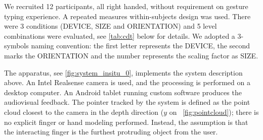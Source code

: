 \documentclass{chi-ext}
\newcommand{\cdt}[1]{{\small\uppercase{{#1}}}}
\begin{document}

We recruited 12 participants, all right handed, without requirement on gesture typing experience.
A repeated measures within-subjects design was used. There were 3 conditions (\cdt{device}, \cdt{size} and \cdt{orientation}) and 5 level combinations were evaluated, see \autoref{tab:cdt} below for details. We adopted a 3-symbols naming convention: the first letter represents the DEVICE, the second marks the ORIENTATION and the number represents the scaling factor as SIZE.

The apparatus, see \autoref{fig:system_insitu_0}, implements the system description above. An Intel Realsense camera is used, and the processing is performed on a desktop computer. An Android tablet running custom software produces the audiovisual feedback. The pointer tracked by the system is defined as the point cloud closest to the camera in the depth direction ($y$ on ~\autoref{fig:pointcloud}); there is no explicit finger or hand modeling performed. Instead, the assumption is that the interacting finger is the furthest protruding object from the user.
\end{document}
